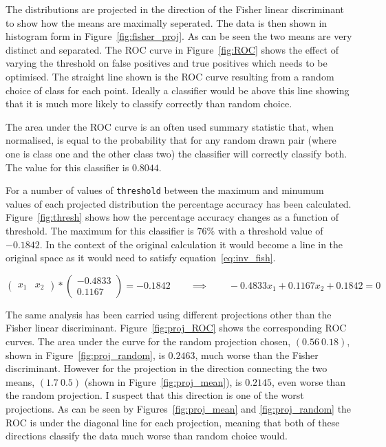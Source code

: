 \documentclass[a4paper,10pt]{article}
\begin{document}
The distributions are projected in the direction of the Fisher linear discriminant to show how the means are maximally seperated. The data is then shown in histogram form in Figure~\ref{fig:fisher_proj}. As can be seen the two means are very distinct and separated. The ROC curve in Figure~\ref{fig:ROC} shows the effect of varying the threshold on false positives and true positives which needs to be optimised. The straight line shown is the ROC curve resulting from a random choice of class for each point. Ideally a classifier would be above this line showing that it is much more likely to classify correctly than random choice.

The area under the ROC curve is an often used summary statistic that, when normalised, is equal to the probability that for any random drawn pair (where one is class one and the other class two) the classifier will correctly classify both. The value for this classifier is $0.8044$.

For a number of values of \lstinline|threshold| between the maximum and minumum values of each projected distribution the percentage accuracy has been calculated. Figure~\ref{fig:thresh} shows how the percentage accuracy changes as a function of threshold. The maximum for this classifier is $76\%$ with a threshold value of $-0.1842$. In the context of the original calculation it would become a line in the original space as it would need to satisfy equation~\ref{eq:inv_fish}.

\begin{equation}\label{eq:inv_fish}
    \begin{pmatrix}
    x_1 & x_2
    \end{pmatrix} *
    \begin{pmatrix}
    -0.4833 \\
    0.1167
    \end{pmatrix} = -0.1842 \qquad \implies \qquad -0.4833x_1 + 0.1167x_2 + 0.1842 = 0
\end{equation}

The same analysis has been carried using different projections other than the Fisher linear discriminant. Figure~\ref{fig:proj_ROC} shows the corresponding ROC curves. The area under the curve for the random projection chosen, $(0.56~0.18)$, shown in Figure~\ref{fig:proj_random}, is $0.2463$, much worse than the Fisher discriminant. However for the projection in the direction connecting the two means, $(1.7~0.5)$ (shown in Figure~\ref{fig:proj_mean}), is $0.2145$, even worse than the random projection. I suspect that this direction is one of the worst projections. As can be seen by Figures~\ref{fig:proj_mean} and \ref{fig:proj_random} the ROC is under the diagonal line for each projection, meaning that both of these directions classify the data much worse than random choice would.
\end{document}
